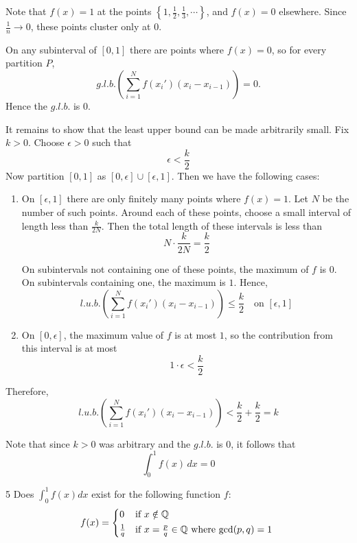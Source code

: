 \documentclass[12pt]{article}
\begin{document}
\begin{solution}
    \bbni

    Note that $f(x)=1$ at the points 
    $\left\{1,\frac{1}{2},\frac{1}{3},\cdots\right\}$,
    and $f(x)=0$ elsewhere. Since $\frac{1}{n}\to 0$, these points
    cluster only at $0$.

    On any subinterval of $[0,1]$ there are points where $f(x)=0$,
    so for every partition $P$,
    \[
    g.l.b.\left(\sum_{i=1}^N f(x_i')(x_i-x_{i-1})\right)=0.
    \]
    Hence the $g.l.b.$ is $0$.
    
    It remains to show that the least upper bound can be made arbitrarily small. Fix $k>0$. Choose $\epsilon>0$ such that
    \[\epsilon < \frac{k}{2}\]
    Now partition $[0,1]$ as $[0,\epsilon] \cup [\epsilon,1]$. Then we have the following cases: 
    \begin{enumerate}
        \item  On $[\epsilon,1]$ there are only finitely many points where $f(x)=1$.
        Let $N$ be the number of such points. Around each of these points,
        choose a small interval of length less than $\frac{k}{2N}$.
        Then the total length of these intervals is less than
        \[N \cdot \frac{k}{2N} = \frac{k}{2}\]

        On subintervals not containing one of these points,
        the maximum of $f$ is $0$. On subintervals containing one,
        the maximum is $1$. Hence,
        \[l.u.b.\left(\sum_{i=1}^N f(x_i')(x_i-x_{i-1})\right)\le \frac{k}{2}\quad \text{on } [\epsilon,1]\]

        \item On $[0,\epsilon]$, the maximum value of $f$ is at most $1$,
        so the contribution from this interval is at most
        \[1 \cdot \epsilon < \frac{k}{2}\]
    \end{enumerate}
   
    Therefore,
    \[    l.u.b.\left(\sum_{i=1}^N f(x_i')(x_i-x_{i-1})\right)
    < \frac{k}{2} + \frac{k}{2} = k\]

    Note that since $k>0$ was arbitrary and the $g.l.b.$ is $0$,
    it follows that
    \[
    \int_0^1 f(x)\,dx = 0
    \]
\end{solution}

\newpage 

\begin{problem}{5}
    Does $\int_0^1 f(x)dx$ exist for the following function $f$: 
    \[f(x) = \begin{cases*}
        0 & \text{if $x \notin \Q$} \\ 
        \frac{1}{q} & \text{if $x = \frac{p}{q}\in \Q$ where $\gcd(p,q) = 1$}
    \end{cases*}\]
\end{problem}
\end{document}
